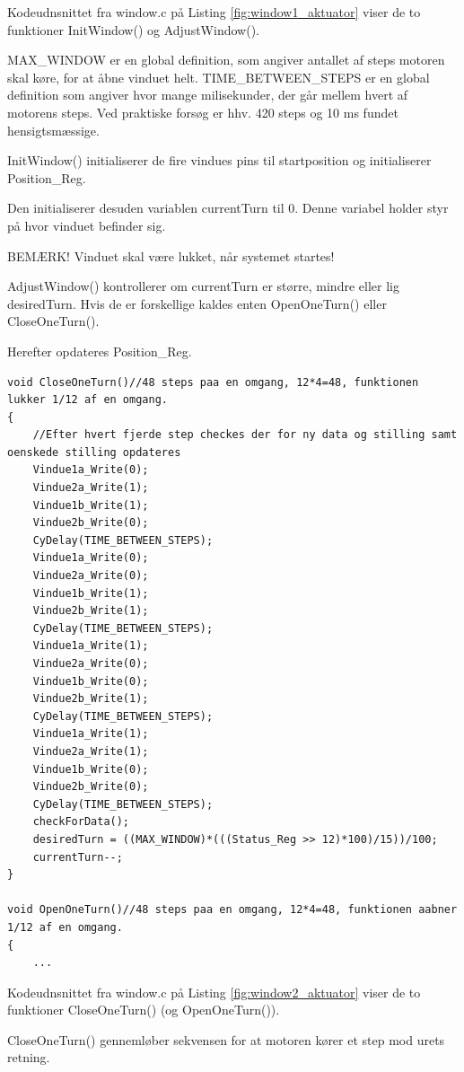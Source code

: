 Kodeudnsnittet fra window.c på Listing \ref{fig:window1_aktuator} viser de to funktioner InitWindow() og AdjustWindow().

MAX\_WINDOW er en global definition, som angiver antallet af steps motoren skal køre, for at åbne vinduet helt. 
TIME\_BETWEEN\_STEPS er en global definition som angiver hvor mange milisekunder, der går mellem hvert af motorens steps. 
Ved praktiske forsøg er hhv. 420 steps og 10 ms fundet hensigtsmæssige.

InitWindow() initialiserer de fire vindues pins til startposition og initialiserer Position\_Reg. 

Den initialiserer desuden variablen currentTurn til 0. Denne variabel holder styr på hvor vinduet befinder sig. 

BEMÆRK! Vinduet skal være lukket, når systemet startes!

AdjustWindow() kontrollerer om currentTurn er større, mindre eller lig desiredTurn. Hvis de er forskellige kaldes enten OpenOneTurn() eller CloseOneTurn().

Herefter opdateres Position\_Reg.

\clearpage

\begin{lstlisting}[caption=Udsnit B af window.c for PSoC4 i Aktuator, label=fig:window2_aktuator]
void CloseOneTurn()//48 steps paa en omgang, 12*4=48, funktionen lukker 1/12 af en omgang.
{
    //Efter hvert fjerde step checkes der for ny data og stilling samt oenskede stilling opdateres
    Vindue1a_Write(0);
    Vindue2a_Write(1);
    Vindue1b_Write(1);
    Vindue2b_Write(0);
    CyDelay(TIME_BETWEEN_STEPS);
    Vindue1a_Write(0);
    Vindue2a_Write(0);
    Vindue1b_Write(1);
    Vindue2b_Write(1);
    CyDelay(TIME_BETWEEN_STEPS);
    Vindue1a_Write(1);
    Vindue2a_Write(0);
    Vindue1b_Write(0);
    Vindue2b_Write(1);
    CyDelay(TIME_BETWEEN_STEPS);
    Vindue1a_Write(1);
    Vindue2a_Write(1);
    Vindue1b_Write(0);
    Vindue2b_Write(0);
    CyDelay(TIME_BETWEEN_STEPS);
    checkForData();
    desiredTurn = ((MAX_WINDOW)*(((Status_Reg >> 12)*100)/15))/100;
    currentTurn--;
}

void OpenOneTurn()//48 steps paa en omgang, 12*4=48, funktionen aabner 1/12 af en omgang.
{
    ...
\end{lstlisting}

Kodeudnsnittet fra window.c på Listing \ref{fig:window2_aktuator} viser de to funktioner CloseOneTurn() (og OpenOneTurn()). 

CloseOneTurn() gennemløber sekvensen for at motoren kører et step mod urets retning.


